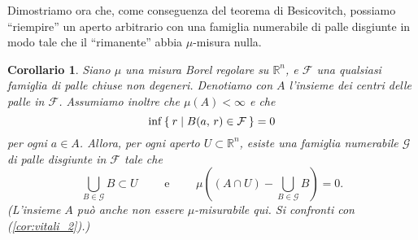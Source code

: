 \documentclass[a4paper,10pt,openright,oneside]{book}
\theoremstyle{theoremstyle}
\newtheorem{corollario}[teorema]{Corollario}
\theoremstyle{theoremstylewoheader}
\theoremstyle{theoremstyle}
\theoremstyle{proofsecstyle}
\theoremstyle{nonumberplain}
\newcommand{\FF}{\ensuremath{\mathcal{F}}}
\newcommand{\GG}{\ensuremath{\mathcal{G}}}
\newcommand{\RR}{\ensuremath{\mathbb{R}}}
\begin{document}
\noindent Dimostriamo ora che, come conseguenza del teorema di Besicovitch, possiamo ``riempire'' un aperto arbitrario con una famiglia numerabile di palle disgiunte in modo tale che il ``rimanente'' abbia $\mu$-misura nulla.

\begin{corollario}
\label{cor:besicovitch}
Siano $\mu$ una misura Borel regolare su $\RR^n$, e $\FF$ una qualsiasi famiglia di palle chiuse non degeneri. Denotiamo con $A$ l'insieme dei centri delle palle in $\FF$. Assumiamo inoltre che $\mu(A) < \infty$ e che
\[
\inf\Set{ r | B(a,\, r) \in \FF } = 0
\]
per ogni $a \in A$. Allora, per ogni aperto $U \subset \RR^n$, esiste una famiglia \emph{numerabile} $\GG$ di palle \emph{disgiunte} in $\FF$ tale che
\[
\bigcup_{B \in \GG} B \subset U\qquad\text{ e }\qquad\mu\left((A \cap U) - \bigcup_{B \in \GG} B\right) = 0.
\]
(L'insieme $A$ può anche non essere $\mu$-misurabile qui. Si confronti con (\ref{cor:vitali_2}).)
\end{corollario}
\end{document}

